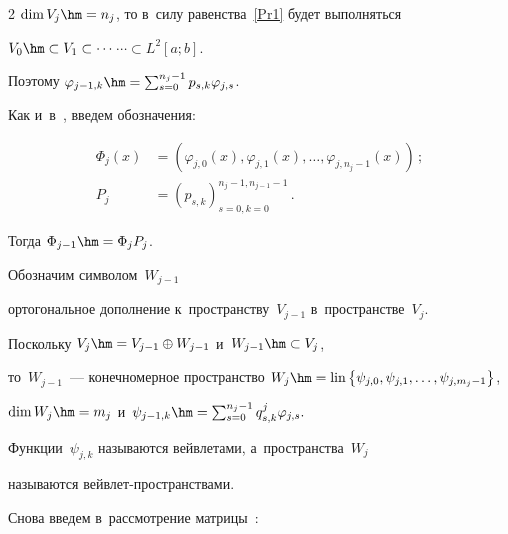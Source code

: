\begin{multicols}{2}
$\dim V_{j} \hm=n_{j}$, то  в~силу равенства~\eqref{Pr1}  будет выполняться 


$V_{0} \hm\subset V_{1} \subset \cdots$\linebreak $\cdots \subset L^{2} \left[a;b\right]$. 


Поэтому $\varphi _{j-1,k} \hm=\sum\nolimits _{s=0}^{n_{j} -1}p_{s,k} \varphi _{j,s}$. 





Как и~в~\cite{ArticleFinkelstein}, введем обозначения: 





\noindent


\begin{align*}


\Phi _{j} (x)&=


\left(\varphi _{j,0} (x),\varphi _{j,1} (x),\ldots,\varphi _{j,n_{j} -1} (x)\right)\,;\\


{P}_{j} &=\left(p_{s,k} \right)_{s=0, k=0}^{n_{j} -1, n_{j-1} -1}\,.


\end{align*}


Тогда $\Phi _{j-1}\hm =\Phi _{j} {P}_{j} $. 





\pagebreak





Обозначим символом~$W_{j-1} $ 


ортогональное дополнение к~пространству~$V_{j-1} $ в~пространстве~$V_{j}$. 


Поскольку $V_{j}\hm =V_{j-1} \oplus W_{j-1} $ и~$W_{j-1} \hm\subset V_{j} $, 


то~$W_{j-1} $~--- конечномерное пространство $ W_{j} \hm = 


\mathrm{lin} \left\{\psi _{j,0} ,\psi _{j,1} ,\ldots,\psi _{j,m_{j} -1} \right\}$,


$\dim W_{j} \hm=m_{j}$ и~$\psi _{j-1,k} \hm=


\sum\nolimits_{s=0}^{n_{j} -1}q_{s,k}^{j} \varphi _{j,s}.$ 


Функции~$\psi _{j,k} $ называются вейвлетами, а~пространства~$W_{j} $ 


называются вейв\-лет-про\-стран\-ст\-вами.





Снова введем в~рассмотрение матрицы~\cite{ArticleFinkelstein}:



\end{multicols}
